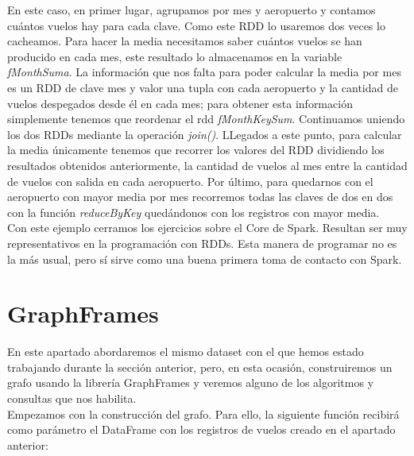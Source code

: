 En este caso, en primer lugar, agrupamos por mes y aeropuerto y contamos cuántos vuelos hay para cada clave. Como este RDD lo usaremos dos veces lo cacheamos. Para hacer la media necesitamos saber cuántos vuelos se han producido en cada mes, este resultado lo almacenamos en la variable \textit{fMonthSuma}. La información que nos falta para poder calcular la media por mes es un RDD de clave mes y valor una tupla con cada aeropuerto y la cantidad de vuelos despegados desde él en cada mes; para obtener esta información simplemente tenemos que reordenar el rdd \textit{fMonthKeySum}. Continuamos uniendo los dos RDDs mediante la operación \textit{join()}. LLegados a este punto, para calcular la media únicamente tenemos que recorrer los valores del RDD dividiendo los resultados obtenidos anteriormente, la cantidad de vuelos al mes entre la cantidad de vuelos con salida en cada aeropuerto. Por último, para quedarnos con el aeropuerto con mayor media por mes recorremos todas las claves de dos en dos con la función \textit{reduceByKey} quedándonos con los registros con mayor media.\\

Con este ejemplo cerramos los ejercicios sobre el Core de Spark. Resultan ser muy representativos en la programación con RDDs. Esta manera de programar no es la más usual, pero sí sirve como una buena primera toma de contacto con Spark.\\

\section{GraphFrames}

En este apartado abordaremos el mismo dataset con el que hemos estado trabajando durante la sección anterior, pero, en esta ocasión, construiremos un grafo usando la librería GraphFrames y veremos alguno de los algoritmos y consultas que nos habilita.\\

Empezamos con la construcción del grafo. Para ello, la siguiente función recibirá como parámetro el DataFrame con los registros de vuelos creado en el apartado anterior:\\

